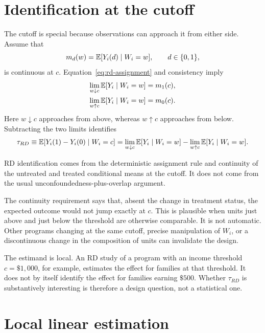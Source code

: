 \section{Identification at the cutoff}
\label{sec:rd-identification}

The cutoff is special because observations can approach it from either side.
Assume that
\[
  m_d(w)=\mathbb{E}[Y_i(d)\mid W_i=w],\qquad d\in\{0,1\},
\]
is continuous at $c$.  Equation~\eqref{eq:rd-assignment} and consistency imply
\begin{align*}
  \lim_{w\downarrow c}\mathbb{E}[Y_i\mid W_i=w]&=m_1(c),\\
  \lim_{w\uparrow c}\mathbb{E}[Y_i\mid W_i=w]&=m_0(c).
\end{align*}
Here $w\downarrow c$ approaches from above, whereas $w\uparrow c$ approaches
from below.  Subtracting the two limits identifies
\begin{equation}
  \tau_{RD}
  \equiv \mathbb{E}[Y_i(1)-Y_i(0)\mid W_i=c]
  =\lim_{w\downarrow c}\mathbb{E}[Y_i\mid W_i=w]
   -\lim_{w\uparrow c}\mathbb{E}[Y_i\mid W_i=w].
  \label{eq:sharp-rd-identification}
\end{equation}

\begin{important}
RD identification comes from the deterministic assignment rule and continuity
of the untreated and treated conditional means at the cutoff.  It does not
come from the usual unconfoundedness-plus-overlap argument.
\end{important}

The continuity requirement says that, absent the change in treatment status,
the expected outcome would not jump exactly at $c$.  This is plausible when
units just above and just below the threshold are otherwise comparable.  It is
not automatic.  Other programs changing at the same cutoff, precise
manipulation of $W_i$, or a discontinuous change in the composition of units
can invalidate the design.

The estimand is local.  An RD study of a program with an income threshold
$c=\$1{,}000$, for example, estimates the effect for families at that
threshold.  It does not by itself identify the effect for families earning
$\$500$.  Whether $\tau_{RD}$ is substantively interesting is therefore a
design question, not a statistical one.

\section{Local linear estimation}
\label{sec:rd-local-linear}

